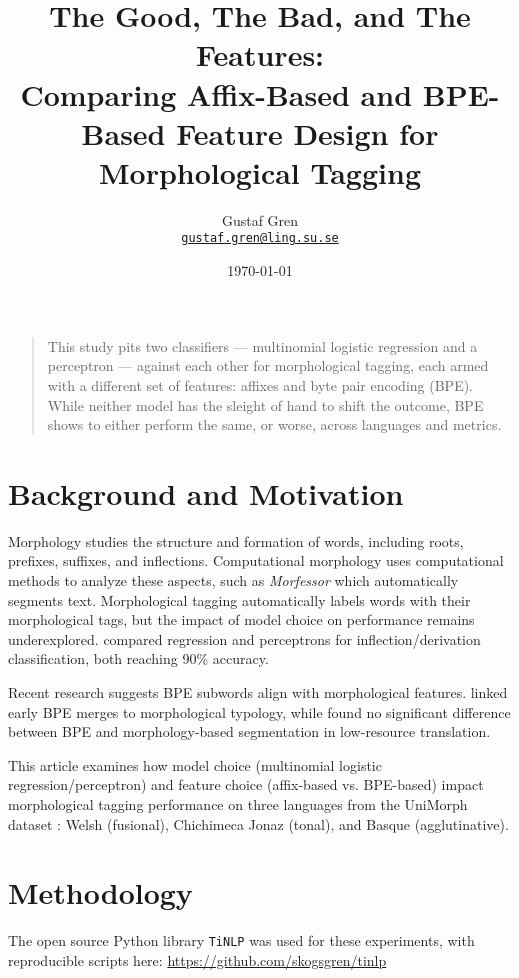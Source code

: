 \documentclass{article}
\title{
	The Good, The Bad, and The Features: \\
	Comparing Affix-Based and BPE-Based Feature Design for
	Morphological Tagging
}
\author{
    Gustaf Gren \\
	\href{mailto:gustaf.gren@ling.su.se}{\texttt{gustaf.gren@ling.su.se}}
}
\date{\today}
\renewenvironment{abstract}{
	\begin{center}\bfseries\abstractname\end{center}
	\begin{quote}}
	{\end{quote}}
\begin{document}
\maketitle

\begin{abstract}

This study pits two classifiers --- multinomial logistic regression and a
perceptron --- against each other for morphological tagging, each armed with a
different set of features: affixes and byte pair encoding (BPE). While neither
model has the sleight of hand to shift the outcome, BPE shows to either perform
the same, or worse, across languages and metrics.

\end{abstract}

\section{Background and Motivation}

Morphology studies the structure and formation of words, including roots,
prefixes, suffixes, and inflections. Computational morphology uses
computational methods to analyze these aspects, such as \textit{Morfessor}
\parencite{smit2014} which automatically segments text. Morphological tagging
automatically labels words with their morphological tags, but the impact of
model choice on performance remains underexplored. \textcite{haley2023}
compared regression and perceptrons for inflection/derivation classification,
both reaching 90\% accuracy.

Recent research suggests BPE subwords align with morphological features.
\textcite{vasques2023} linked early BPE merges to morphological typology, while
\textcite{saleva2021} found no significant difference between BPE and
morphology-based segmentation in low-resource translation.

This article examines how model choice (multinomial logistic
regression/perceptron) and feature choice (affix-based vs. BPE-based) impact
morphological tagging performance on three languages from the UniMorph dataset
\parencite{batsuren2022}: Welsh (fusional), Chichimeca Jonaz (tonal), and
Basque (agglutinative).

\section{Methodology}

The open source Python library \texttt{TiNLP} was used for these experiments,
with reproducible scripts here: \url{https://github.com/skogsgren/tinlp}
\end{document}
